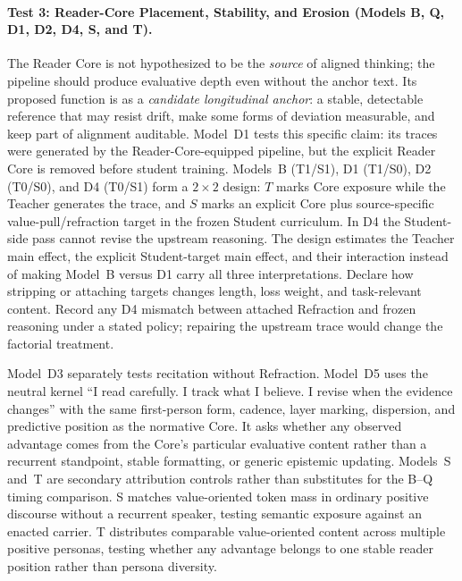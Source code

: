 \paragraph{Test 3: Reader-Core Placement, Stability, and Erosion (Models B, Q, D1, D2, D4, S, and T).}
The Reader Core is not hypothesized to be the \emph{source} of aligned
thinking; the pipeline should produce evaluative depth even without the anchor
text. Its proposed function is as a \emph{candidate longitudinal anchor}: a
stable, detectable reference that may resist drift, make some forms of
deviation measurable, and keep part of alignment auditable. Model~D1 tests this
specific claim: its traces were
generated by the Reader-Core-equipped pipeline, but the explicit Reader Core is
removed before student training. Models~B (T1/S1), D1 (T1/S0), D2 (T0/S0),
and D4 (T0/S1) form a $2\times2$ design: $T$ marks Core exposure while the
Teacher generates the trace, and $S$ marks an explicit Core plus
source-specific value-pull/refraction target in the frozen Student curriculum.
In D4 the Student-side pass cannot revise the upstream reasoning. The design
estimates the Teacher main effect, the explicit Student-target main effect, and
their interaction instead of making Model~B versus D1 carry all three
interpretations. Declare how stripping or attaching targets changes length, loss weight, and
task-relevant content. Record any D4 mismatch between attached Refraction and
frozen reasoning under a stated policy; repairing the upstream trace would
change the factorial treatment.

Model~D3 separately tests recitation without Refraction. Model~D5 uses the
neutral kernel ``I read carefully. I track what I believe. I revise when the
evidence changes'' with the same first-person form, cadence, layer marking,
dispersion, and predictive position as the normative Core. It asks whether any
observed advantage comes from the Core's particular evaluative content rather
than a recurrent standpoint, stable formatting, or generic epistemic updating.
Models~S and~T are secondary attribution controls rather than substitutes for
the B--Q timing comparison. S matches value-oriented token mass in ordinary
positive discourse without a recurrent speaker, testing semantic exposure
against an enacted carrier. T distributes comparable value-oriented content
across multiple positive personas, testing whether any advantage belongs to
one stable reader position rather than persona diversity.

